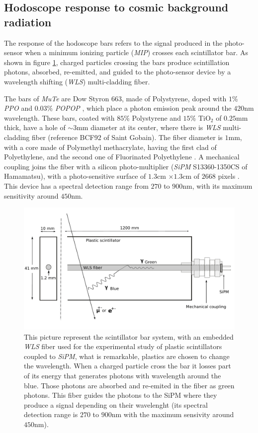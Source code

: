 \documentclass[submitting]{nst}
\begin{document}
\subsection{Hodoscope response to cosmic background radiation}\label{sec:hodoscope-response}
The response of the hodoscope bars refers to the signal produced in the photo-sensor when a minimum ionizing particle (\textsl{MIP}) crosses each scintillator bar. As shown in figure \ref{esquema_centelladora}, charged particles crossing the bars produce scintillation photons, absorbed, re-emitted, and guided to the photo-sensor device by a wavelength shifting (\textsl{WLS}) multi-cladding fiber. 

The bars of \textsl{MuTe} are Dow Styron $663$, made of Polystyrene, doped with $1$\% \textsl{PPO} and $0.03$\% \textsl{POPOP} \cite{PlaBrossRykalin2003}, which place a photon emission peak around the $420$nm wavelength. These bars, coated with $85$\% Polystyrene and $15$\% TiO$_2$ of $0.25$mm thick, have a hole of $\sim 3$mm diameter at its center,  where there is \textsl{WLS} multi-cladding fiber (reference BCF92 of Saint Gobain). The fiber diameter is $1$mm, with a core made of Polymethyl methacrylate, having the first clad of Polyethylene, and the second one of Fluorinated Polyethylene \cite{SaintGobain2017}. A mechanical coupling joins the fiber with a silicon photo-multiplier (\textsl{SiPM} S13360-1350CS of Hamamatsu), with a photo-sensitive surface of $1.3$cm $\times 1.3$cm of $2668$ pixels \cite{Hamamatsu2018}. This device has a spectral detection range from $270$ to $900$nm, with its maximum sensitivity around $450$nm.

\begin{figure}[h!] %
    \centering
        \includegraphics[scale=0.21]{Figures/esquema_barra.jpeg}
   \caption{This picture represent the scintillator bar system, with an embedded \textsl{WLS} fiber used for the experimental study of plastic scintillators coupled to \textsl{SiPM}, what is remarkable, plastics are chosen to change the wavelength. When a charged particle cross the bar it losses part of its energy that generates photons with wavelength around the blue. Those photons are absorbed and re-emited in the fiber as green photons. This fiber guides the photons to the SiPM where they produce a signal depending on their wavelenght (its spectral detection range is $270$ to $900$nm with the maximum sensivity around $450$nm).}\label{esquema_centelladora}
\end{figure}
\end{document}
